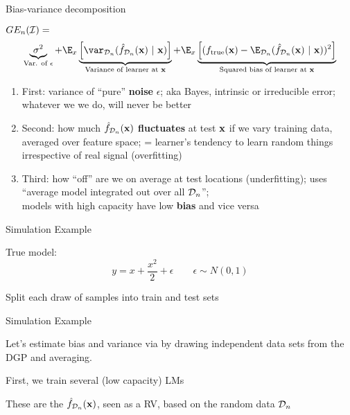\documentclass[11pt,compress,t,notes=noshow, xcolor=table]{beamer}
\begin{document}
\begin{frame}{Bias-variance decomposition}


$GE_n(\mathcal{I}) =$  
$$
\underbrace{\sigma^2}_{\text{Var. of $\epsilon$}} + \E_{x}\underbrace{\left[\var_{\D_n}(\fh_{\D_n}(\xv) ~|~\xv)\right]}_{\text{Variance of learner at } \xv} + \E_{x}\underbrace{\left[(\ftrue(\xv)-\E_{\D_n}(\fh_{\D_n}(\xv)~|~\xv))^2\right]}_{\text{Squared bias of learner at } \xv}  
$$

\begin{enumerate}
\item First: variance of ``pure''
\textbf{noise} $\epsilon$; aka Bayes, intrinsic or irreducible error; 
whatever we we do, will never be better
\item Second: how much \textbf{$\hat{f}_{\mathcal{D}_n}(\mathbf{x})$ fluctuates} at test $\mathbf{x}$ if we vary training data, averaged over feature space; = learner's tendency to learn random things irrespective of real signal (overfitting)

\item Third: how ``off'' are we on average at test locations (underfitting); uses ``average model integrated out over all $\mathcal{D}_n$''; \\
models with high capacity have low \textbf{bias} and vice versa
\end{enumerate}


\end{frame} 

\begin{framei}[sep=L]{Simulation Example}

\item True model:
$$y = x + \frac{x^2}{2} + \epsilon  \qquad \epsilon \sim 
N (0, 1)$$
\item Split each draw of samples into train and test sets 


\end{framei} 


\begin{framei}[sep=M]{Simulation Example}

\item Let's estimate bias and variance via by drawing independent data sets from the DGP and averaging.


\item First, we train several (low capacity) LMs
\item These are the $\hat{f}_{\mathcal{D}_n}(\mathbf{x})$, seen as a RV, based on the random
data $\mathcal{D}_n$

\hfill

\splitVCC
{}
{}

\end{framei} 
\end{document}
